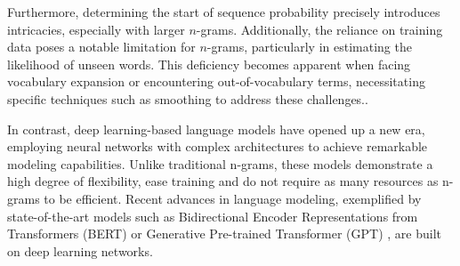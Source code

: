 Furthermore, determining the start of sequence probability precisely introduces intricacies, especially with larger $n$-grams. Additionally, the reliance on training data poses a notable limitation for $n$-grams, particularly in estimating the likelihood of unseen words. This deficiency becomes apparent when facing vocabulary expansion or encountering out-of-vocabulary terms, necessitating specific techniques such as smoothing to address these challenges.\cite{n-grams-smoothing}.

In contrast, deep learning-based language models have opened up a new era, employing neural networks with complex architectures to achieve remarkable modeling capabilities. Unlike traditional n-grams, these models demonstrate a high degree of flexibility, ease training and do not require as many resources as n-grams to be efficient. Recent advances in language modeling, exemplified by state-of-the-art models such as Bidirectional Encoder Representations from Transformers (BERT) \cite{Bert} or Generative Pre-trained Transformer (GPT) \cite{brown2020language}, are built on deep learning networks.

